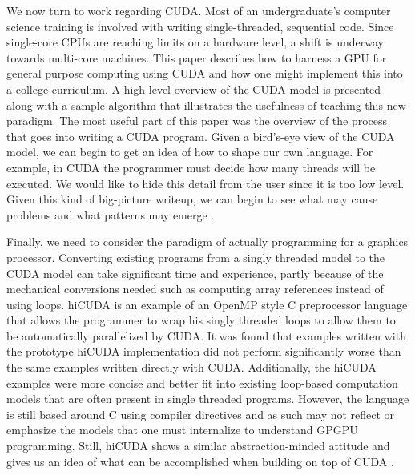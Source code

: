 \documentclass{article}
\begin{document}
We now turn to work regarding CUDA. Most of an undergraduate's computer science training is involved with writing single-threaded, sequential code. Since single-core CPUs are reaching limits on a hardware level, a shift is underway towards multi-core machines. This paper describes how to harness a GPU for general purpose computing using CUDA and how one might implement this into a college curriculum. A high-level overview of the CUDA model is presented along with a sample algorithm that illustrates the usefulness of teaching this new paradigm. The most useful part of this paper was the overview of the process that goes into writing a CUDA program. Given a bird's-eye view of the CUDA model, we can begin to get an idea of how to shape our own language. For example, in CUDA the programmer must decide how many threads will be executed. We would like to hide this detail from the user since it is too low level. Given this kind of big-picture writeup, we can begin to see what may cause problems and what patterns may emerge \cite{tran}.

Finally, we need to consider the paradigm of actually programming for a graphics processor. Converting existing programs from a singly threaded model to the CUDA model can take significant time and experience, partly because of the mechanical conversions needed such as computing array references instead of using loops. hiCUDA is an example of an OpenMP style C preprocessor language that allows the programmer to wrap his singly threaded loops to allow them to be automatically parallelized by CUDA. It was found that examples written with the prototype hiCUDA implementation did not perform significantly worse than the same examples written directly with CUDA. Additionally, the hiCUDA examples were more concise and better fit into existing loop-based computation models that are often present in single threaded programs. However, the language is still based around C using compiler directives and as such may not reflect or emphasize the models that one must internalize to understand GPGPU programming. Still, hiCUDA shows a similar abstraction-minded attitude and gives us an idea of what can be accomplished when building on top of CUDA \cite{han}.
\end{document}
